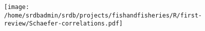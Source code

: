 \documentclass[letterpaper,review,authoryear,12pt]{myelsarticle}
\begin{document}
\begin{appendix}
\begin{figure}
\begin{center}
\texttt{[image: /home/srdbadmin/srdb/projects/fishandfisheries/R/first-review/Schaefer-correlations.pdf]}
\end{center}
\caption{ }\label{fig:corr}
\end{figure}





\end{appendix}
\end{document}
